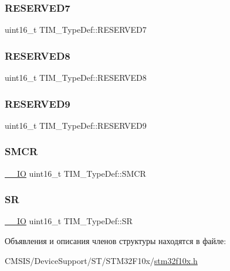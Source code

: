 \subsubsection{\texorpdfstring{RESERVED7}{RESERVED7}}
{\footnotesize\ttfamily uint16\+\_\+t T\+I\+M\+\_\+\+Type\+Def\+::\+R\+E\+S\+E\+R\+V\+E\+D7}

\mbox{\label{struct_t_i_m___type_def_ac708e4f0f142ac14d7e1c46778ed6f96}} 
\subsubsection{\texorpdfstring{RESERVED8}{RESERVED8}}
{\footnotesize\ttfamily uint16\+\_\+t T\+I\+M\+\_\+\+Type\+Def\+::\+R\+E\+S\+E\+R\+V\+E\+D8}

\mbox{\label{struct_t_i_m___type_def_a6754dd714ff0885e8e511977d2f393ce}} 
\subsubsection{\texorpdfstring{RESERVED9}{RESERVED9}}
{\footnotesize\ttfamily uint16\+\_\+t T\+I\+M\+\_\+\+Type\+Def\+::\+R\+E\+S\+E\+R\+V\+E\+D9}

\mbox{\label{struct_t_i_m___type_def_a476012f1b4567ffc21ded0b5fd50985e}} 
\subsubsection{\texorpdfstring{SMCR}{SMCR}}
{\footnotesize\ttfamily \mbox{\hyperlink{group___c_m_s_i_s___c_m3__core__definitions_gaec43007d9998a0a0e01faede4133d6be}{\+\_\+\+\_\+\+IO}} uint16\+\_\+t T\+I\+M\+\_\+\+Type\+Def\+::\+S\+M\+CR}

\mbox{\label{struct_t_i_m___type_def_af686e22c1792dc59dfeffe451d47cf13}} 
\subsubsection{\texorpdfstring{SR}{SR}}
{\footnotesize\ttfamily \mbox{\hyperlink{group___c_m_s_i_s___c_m3__core__definitions_gaec43007d9998a0a0e01faede4133d6be}{\+\_\+\+\_\+\+IO}} uint16\+\_\+t T\+I\+M\+\_\+\+Type\+Def\+::\+SR}



Объявления и описания членов структуры находятся в файле\+:\begin{DoxyCompactItemize}
\item 
C\+M\+S\+I\+S/\+Device\+Support/\+S\+T/\+S\+T\+M32\+F10x/\mbox{\hyperlink{stm32f10x_8h}{stm32f10x.\+h}}\end{DoxyCompactItemize}
